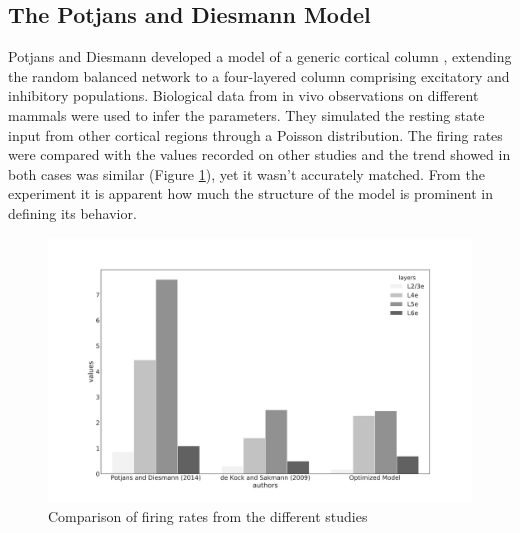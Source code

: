 \subsection{The Potjans and Diesmann Model} 

Potjans and Diesmann developed a model of a generic cortical column \cite{potjans}, extending the random balanced network \cite{brunel} to a four-layered column comprising excitatory and inhibitory populations. Biological data from in vivo observations on different mammals were used to infer the parameters. They simulated the resting state input from other cortical regions through a Poisson distribution.
The firing rates were compared with the values recorded on other studies \cite{kock} and the trend showed in both cases was similar (Figure \ref{fig:potjans_barplot}), yet it wasn't accurately matched. From the experiment it is apparent how much the structure of the model is prominent in defining its behavior.

\begin{figure}[h]
	\raggedleft
	\includegraphics[scale=0.4]{pictures/potjans_barplot.pdf}
	\caption{Comparison of firing rates from the different studies}
	\label{fig:potjans_barplot}
\end{figure}

